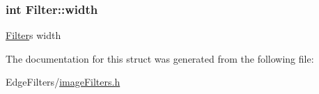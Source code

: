 \subsubsection[{width}]{\setlength{\rightskip}{0pt plus 5cm}int Filter\+::width}\label{struct_filter_a4cc9de0bbbb278889fec030c16078ba3}
\hyperlink{struct_filter}{Filter}\textquotesingle{}s width 

The documentation for this struct was generated from the following file\+:\begin{DoxyCompactItemize}
\item 
Edge\+Filters/\hyperlink{image_filters_8h}{image\+Filters.\+h}\end{DoxyCompactItemize}
